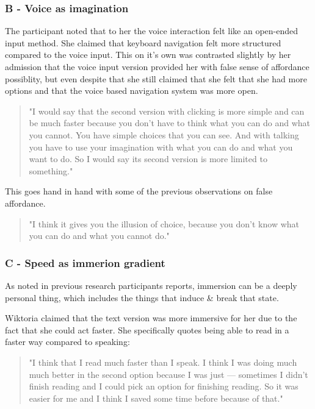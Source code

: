 \subsubsection{B - Voice as imagination}

The participant noted that to her the voice interaction felt like an open-ended input method. She claimed that keyboard navigation felt more structured compared to the voice input. This on it's own was contrasted slightly by her admission that the voice input version provided her with false sense of affordance possiblity, but even despite that she still claimed that she felt that she had more options and that the voice based navigation system was more open.

\begin{quote}
    "I would say that the second version with clicking is more simple and can be much faster because you don't have to think what you can do and what you cannot. You have simple choices that you can see. And with talking you have to use your imagination with what you can do and what you want to do. So I would say its second version is more limited to something."
\end{quote}

This goes hand in hand with some of the previous observations on false affordance.

\begin{quote}
    "I think it gives you the illusion of choice, because you don't know what you can do and what you cannot do."
\end{quote}


\subsubsection{C - Speed as immerion gradient}

As noted in previous research participants reports, immersion can be a deeply personal thing, which includes the things that induce \& break that state. 

Wiktoria claimed that the text version was more immersive for her due to the fact that she could act faster. She specifically quotes being able to read in a faster way compared to speaking:

\begin{quote}
    "I think that I read much faster than I speak. I think I was doing much much better in the second option because I was just — sometimes I didn't finish reading and I could pick an option for finishing reading. So it was easier for me and I think I saved some time before because of that."
\end{quote}

